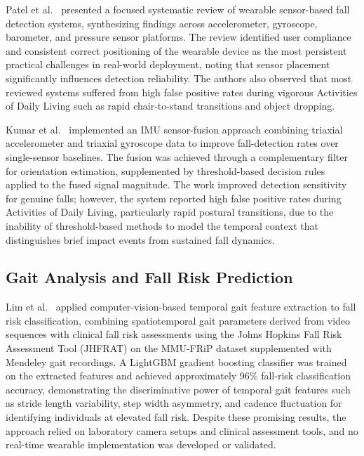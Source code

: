 \documentclass[conference]{IEEEtran}
\begin{document}
Patel et al.~\cite{patel2023} presented a focused systematic review of
wearable sensor-based fall detection systems, synthesizing findings across
accelerometer, gyroscope, barometer, and pressure sensor platforms. The
review identified user compliance and consistent correct positioning of the
wearable device as the most persistent practical challenges in real-world
deployment, noting that sensor placement significantly influences detection
reliability. The authors also observed that most reviewed systems suffered
from high false positive rates during vigorous Activities of Daily Living
such as rapid chair-to-stand transitions and object dropping.

Kumar et al.~\cite{kumar2024} implemented an IMU sensor-fusion approach
combining triaxial accelerometer and triaxial gyroscope data to improve
fall-detection rates over single-sensor baselines. The fusion was achieved
through a complementary filter for orientation estimation, supplemented by
threshold-based decision rules applied to the fused signal magnitude. The
work improved detection sensitivity for genuine falls; however, the system
reported high false positive rates during Activities of Daily Living,
particularly rapid postural transitions, due to the inability of
threshold-based methods to model the temporal context that distinguishes
brief impact events from sustained fall dynamics.

\subsection{Gait Analysis and Fall Risk Prediction}

Lim et al.~\cite{lim2024} applied computer-vision-based temporal gait
feature extraction to fall risk classification, combining spatiotemporal
gait parameters derived from video sequences with clinical fall risk
assessments using the Johns Hopkins Fall Risk Assessment Tool (JHFRAT) on
the MMU-FRiP dataset supplemented with Mendeley gait recordings. A LightGBM
gradient boosting classifier was trained on the extracted features and
achieved approximately 96\% fall-risk classification accuracy, demonstrating
the discriminative power of temporal gait features such as stride length
variability, step width asymmetry, and cadence fluctuation for identifying
individuals at elevated fall risk. Despite these promising results, the
approach relied on laboratory camera setups and clinical assessment tools,
and no real-time wearable implementation was developed or validated.
\end{document}
